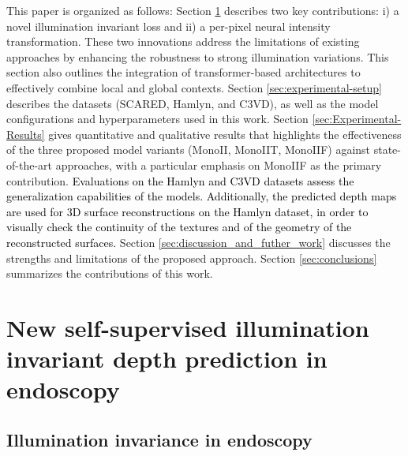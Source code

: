 \documentclass[a4paper,fleqn]{cas-dc}
\begin{document}
This paper is organized as follows: Section \ref{sec:methods_and_data} describes two key contributions: i) a novel illumination invariant loss and ii) a per-pixel neural intensity transformation. These two innovations address the limitations of existing approaches by enhancing the robustness to strong illumination variations. This section also outlines the integration of transformer-based architectures to effectively combine local and global contexts. Section \ref{sec:experimental-setup} describes the datasets (SCARED, Hamlyn, and C3VD), as well as the model configurations and hyperparameters used in this work. Section \ref{sec:Experimental-Results} gives quantitative and qualitative results that highlights the effectiveness of the three proposed model variants (MonoII, MonoIIT, MonoIIF) against state-of-the-art approaches, with a particular emphasis on MonoIIF as the primary contribution. \textcolor{black}{Evaluations on the Hamlyn and C3VD datasets assess the generalization capabilities of the models. Additionally, the predicted depth maps are used for 3D surface reconstructions on the Hamlyn dataset, in order to visually check the continuity of the textures and of the geometry of the reconstructed surfaces.} Section \ref{sec:discussion_and_futher_work} discusses the strengths and limitations of the proposed approach. Section \ref{sec:conclusions} summarizes the contributions of this work. 

\section{New self-supervised illumination invariant
 depth prediction in endoscopy}
\label{sec:methods_and_data}

\subsection{Illumination invariance in endoscopy \label{sec:illumination_models}}
\end{document}
